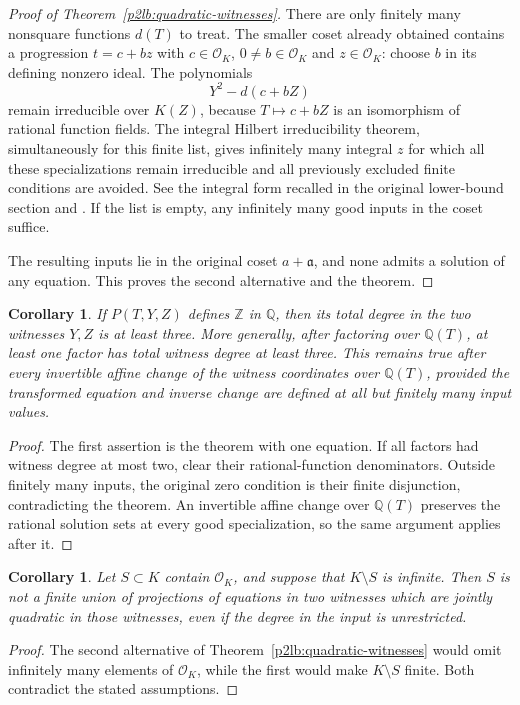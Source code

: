 \documentclass[11pt]{article}
\newtheorem{corollary}[theorem]{Corollary}
\theoremstyle{definition}
\begin{document}
\begin{proof}[Proof of Theorem~\ref{p2lb:quadratic-witnesses}]
There are only finitely many nonsquare functions $d(T)$ to treat.
The smaller coset already obtained contains a progression
$t=c+bz$ with $c\in\mathcal O_K$, $0\ne b\in\mathcal O_K$
and $z\in\mathcal O_K$: choose $b$ in its defining nonzero ideal.
The polynomials
\[
                         Y^2-d(c+bZ)
\]
remain irreducible over $K(Z)$, because $T\mapsto c+bZ$ is an
isomorphism of rational function fields.  The integral Hilbert
irreducibility theorem, simultaneously for this finite list, gives
infinitely many integral $z$ for which all these specializations
remain irreducible and all previously excluded finite conditions are
avoided.  See the integral form recalled in the original lower-bound
section and \cite[Introduction]{lbMuller2001}.  If the list is empty,
any infinitely many good inputs in the coset suffice.

The resulting inputs lie in the original coset $a+\mathfrak a$,
and none admits a solution of any equation.  This proves the second
alternative and the theorem.
\end{proof}

\begin{corollary}\label{p2lb:two-witness-degree-three}
If $P(T,Y,Z)$ defines $\mathbb Z$ in $\mathbb Q$, then its total
degree in the two witnesses $Y,Z$ is at least three.  More generally,
after factoring over $\mathbb Q(T)$, at least one factor has total
witness degree at least three.  This remains true after every
invertible affine change of the witness coordinates over
$\mathbb Q(T)$, provided the transformed equation and inverse change
are defined at all but finitely many input values.
\end{corollary}
\begin{proof}
The first assertion is the theorem with one equation.  If all factors
had witness degree at most two, clear their rational-function
denominators.  Outside finitely many inputs, the original zero condition
is their finite disjunction, contradicting the theorem.  An invertible
affine change over $\mathbb Q(T)$ preserves the rational solution sets
at every good specialization, so the same argument applies after it.
\end{proof}

\begin{corollary}\label{p2lb:conic-integral-superset}
Let $S\subset K$ contain $\mathcal O_K$, and suppose that $K\setminus S$
is infinite.  Then $S$ is not a finite union of projections of equations
in two witnesses which are jointly quadratic in those witnesses, even if
the degree in the input is unrestricted.
\end{corollary}
\begin{proof}
The second alternative of Theorem~\ref{p2lb:quadratic-witnesses} would
omit infinitely many elements of $\mathcal O_K$, while the first would
make $K\setminus S$ finite.  Both contradict the stated assumptions.
\end{proof}
\end{document}

